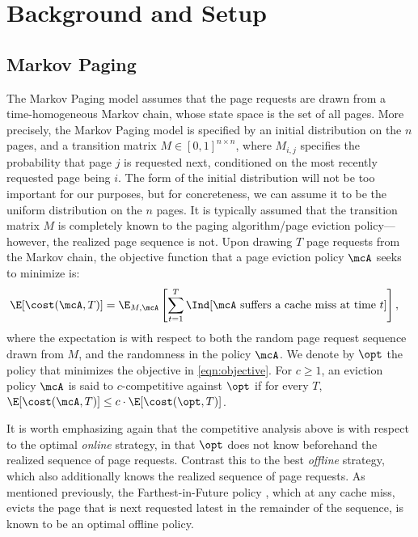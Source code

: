\section{Background and Setup}
\label{sec:background}



\subsection{Markov Paging}
\label{sec:markov-paging}

The Markov Paging model assumes that the page requests are drawn from a time-homogeneous Markov chain, whose state space is the set of all pages. More precisely, the Markov Paging model is specified by an initial distribution on the $n$ pages, and a transition matrix $M \in [0,1]^{n \times n}$, where $M_{i,j}$ specifies the probability that page $j$ is requested next, conditioned on the most recently requested page being $i$. The form of the initial distribution will not be too important for our purposes, but for concreteness, we can assume it to be the uniform distribution on the $n$ pages. It is typically assumed that the transition matrix $M$ is completely known to the paging algorithm/page eviction policy---however, the realized page sequence is not. Upon drawing $T$ page requests from the Markov chain, the objective function that a page eviction policy $\mcA$ seeks to minimize is:
\begin{align}
    \label{eqn:objective}
    \E[\cost(\mcA, T)] &= \E_{M, \mcA}\left[\sum_{t=1}^T\Ind[\text{$\mcA$ suffers a cache miss at time $t$}]\right],
\end{align}
where the expectation is with respect to both the random page request sequence drawn from $M$, and the randomness in the policy $\mcA$. We denote by $\opt$ the policy that minimizes the objective in \eqref{eqn:objective}. For $c \ge 1$, an eviction policy $\mcA$ is said to $c$-competitive against $\opt$ if for every $T$, $ \E[\cost(\mcA, T)] \le c \cdot \E[\cost(\opt, T)]$.

It is worth emphasizing again that the competitive analysis above is with respect to the optimal \textit{online} strategy, in that $\opt$ does not know beforehand the realized sequence of page requests. Contrast this to the best \textit{offline} strategy, which also additionally knows the realized sequence of page requests. As mentioned previously, the Farthest-in-Future policy \citep{belady1966study}, which at any cache miss, evicts the page that is next requested latest in the remainder of the sequence, is known to be an optimal offline policy. %


